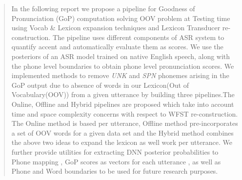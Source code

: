 \documentclass[letterpaper,12pt]{article}
\begin{document}
\begin{abstract}

In the following report we propose a  pipeline for Goodness of Pronunciation (GoP) computation solving OOV problem at Testing time using Vocab \& Lexicon expansion techniques and Lexicon Transducer re-construction.
The pipeline  uses different components of ASR 
system to quantify accent and automatically evaluate them as scores. We use the posteriors of 
an ASR model trained on native English speech, along with the phone level boundaries to obtain 
phone level pronunciation scores. We implemented methods 
to remove \emph{UNK} and \emph{SPN} phonemes arising in the GoP output due to absence of words in our Lexicon(Out of Vocabulary(OOV))  from a given utterance  by building three pipelines.The Online, Offline and Hybrid pipelines are proposed which take into account time and space complexity concerns with respect to WFST re-construction. The Online method is based per utterance, Offline method pre-incorporates a set of OOV words for a given data set and the Hybrid method combines the above two ideas to expand the lexicon as well work per utterance. We further provide utilities for  extracting DNN  posterior probabilities to Phone mapping , GoP scores as vectors for  each utterance , as well as Phone and Word boundaries to be used for future research purposes.


\end{abstract}
\end{document}
